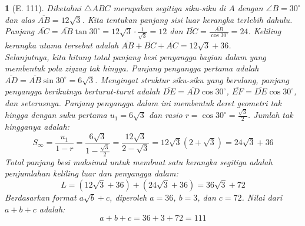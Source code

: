 \documentclass[11pt,a4paper,DIV=12]{scrartcl}
\theoremstyle{problemstyle}
\theoremstyle{answerstyle}
\newtheorem{answer}{}
\begin{document}
\begin{answer}[E. 111]
  Diketahui $\triangle ABC$ merupakan segitiga siku-siku di $A$ dengan $\angle B = 30^\circ$ dan alas $\overline{AB} = 12\sqrt{3}$. Kita tentukan panjang sisi luar kerangka terlebih dahulu. Panjang $\overline{AC} = \overline{AB} \tan 30^\circ = 12\sqrt{3} \cdot \frac{1}{\sqrt{3}} = 12$ dan $\overline{BC} = \frac{\overline{AB}}{\cos 30^\circ} = 24$. Keliling kerangka utama tersebut adalah $\overline{AB} + \overline{BC} + \overline{AC} = 12\sqrt{3} + 36$.\\
  Selanjutnya, kita hitung total panjang besi penyangga bagian dalam yang membentuk pola zigzag tak hingga. Panjang penyangga pertama adalah $\overline{AD} = \overline{AB} \sin 30^\circ = 6\sqrt{3}$. Mengingat struktur siku-siku yang berulang, panjang penyangga berikutnya berturut-turut adalah $\overline{DE} = \overline{AD} \cos 30^\circ$, $\overline{EF} = \overline{DE} \cos 30^\circ$, dan seterusnya. Panjang penyangga dalam ini membentuk deret geometri tak hingga dengan suku pertama $u_1 = 6\sqrt{3}$ dan rasio $r = \cos 30^\circ = \frac{\sqrt{3}}{2}$. Jumlah tak hingganya adalah:
  \[
    S_{\infty} = \frac{u_1}{1 - r} = \frac{6\sqrt{3}}{1 - \frac{\sqrt{3}}{2}} = \frac{12\sqrt{3}}{2 - \sqrt{3}} = 12\sqrt{3}(2 + \sqrt{3}) = 24\sqrt{3} + 36
  \]
  Total panjang besi maksimal untuk membuat satu kerangka segitiga adalah penjumlahan keliling luar dan penyangga dalam:
  \[
    L = (12\sqrt{3} + 36) + (24\sqrt{3} + 36) = 36\sqrt{3} + 72
  \]
  Berdasarkan format $a\sqrt{b} + c$, diperoleh $a = 36$, $b = 3$, dan $c = 72$. Nilai dari $a+b+c$ adalah:
  \[
    a+b+c = 36 + 3 + 72 = \boxed{111}
  \]
\end{answer}
\end{document}
